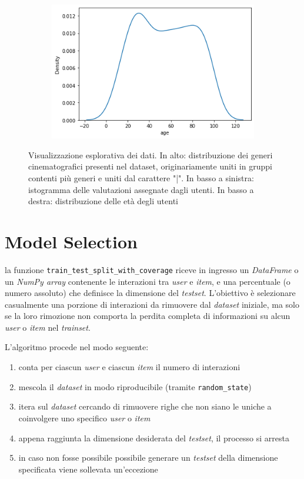 \begin{figure}[H]
\begin{subfigure}[b]{0.49\textwidth}
    \end{subfigure}
    \hfill
    \begin{subfigure}[b]{0.49\textwidth}
        \includegraphics[width=\textwidth]{figures/visualization/output3.png}
    \end{subfigure}

    \caption{Visualizzazione esplorativa dei dati. In alto: distribuzione dei generi cinematografici presenti nel dataset, originariamente uniti in gruppi contenti più generi e uniti dal carattere "|". In basso a sinistra: istogramma delle valutazioni assegnate dagli utenti. In basso a destra: distribuzione delle età degli utenti
}
\end{figure}

\section{Model Selection}

la funzione \texttt{train\_test\_split\_with\_coverage} riceve in ingresso un \textit{DataFrame} o un \textit{NumPy array} contenente le interazioni tra \textit{user} e \textit{item}, e una percentuale (o numero assoluto) che definisce la dimensione del \textit{testset}. L'obiettivo è selezionare casualmente una porzione di interazioni da rimuovere dal \textit{dataset} iniziale, ma solo se la loro rimozione non comporta la perdita completa di informazioni su alcun \textit{user} o \textit{item} nel \textit{trainset}.

L'algoritmo procede nel modo seguente:
\begin{enumerate}
    \item conta per ciascun \textit{user} e ciascun \textit{item} il numero di interazioni
    \item mescola il \textit{dataset} in modo riproducibile (tramite \texttt{random\_state})
    \item itera sul \textit{dataset} cercando di rimuovere righe che non siano le uniche a coinvolgere uno specifico \textit{user} o \textit{item}
    \item appena raggiunta la dimensione desiderata del \textit{testset}, il processo si arresta
    \item in caso non fosse possibile possibile generare un \textit{testset} della dimensione specificata viene sollevata un'eccezione
\end{enumerate}

